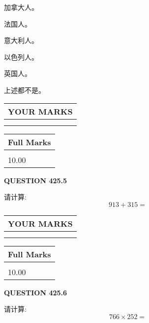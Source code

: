 \documentclass{ctexart}
\begin{document}
  
 
 
加拿大人。
 
 
法国人。
 
 
意大利人。
 
 
以色列人。
 
 
英国人。
 
 
 上述都不是。
 
 
  
\vspace{0.2in}
  
\noindent\begin{tabular}{|l|}
\hline
 YOUR MARKS  \\
\hline
 \\ 
 \\ 
\hline
\end{tabular}
\hspace{0.05in} \begin{tabular}{|l|}
\hline
 Full Marks  \\
\hline
 \\ 
10.00 \\
\hline
\end{tabular}
{\textbf{\Large{QUESTION
425.5 
}}}
  
  
 
请计算:
\begin{equation}
913 +  %
315 = \nonumber
\end{equation}
 

 

 
  
\vspace{0.2in}
  
\noindent\begin{tabular}{|l|}
\hline
 YOUR MARKS  \\
\hline
 \\ 
 \\ 
\hline
\end{tabular}
\hspace{0.05in} \begin{tabular}{|l|}
\hline
 Full Marks  \\
\hline
 \\ 
10.00 \\
\hline
\end{tabular}
{\textbf{\Large{QUESTION
425.6 
}}}
  
  
 
请计算:
\begin{equation}
766  \times    %
252 = \nonumber
\end{equation}
 
\end{document}
